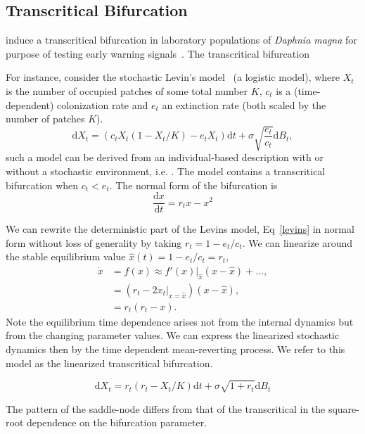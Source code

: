 \documentclass[authoryear, preprint,review,12pt]{elsarticle}
\newcommand{\ud}{\mathrm{d}}
\begin{document}
\subsection{Transcritical Bifurcation}
\citet{Drake2010} induce a transcritical bifurcation in laboratory populations of \emph{Daphnia magna} for purpose of testing early warning signals~\citep{Drake2010}. The transcritical bifurcation 

For instance, consider the stochastic Levin's model~\citep{Levins1969} (a logistic model), where $X_t$ is the number of occupied patches of some total number $K$, $c_t$ is a (time-dependent) colonization rate and $e_t$ an extinction rate (both scaled by the number of patches $K$).  
\begin{equation}
\ud X_t = \left( c_t X_t (1-X_t/K) - e_t X_t \right) \ud t + \sigma \sqrt{\frac{e_t}{c_t}} \ud B_t \label{levins},
\end{equation}
such a model can be derived from an individual-based description with or without a stochastic environment, i.e.  \citep{Kampen2007a, Nisbet2004a}.  The model contains a transcritical bifurcation when $c_t < e_t$.  The normal form of the bifurcation is
\begin{equation}
\frac{\ud x}{\ud t} = r_t x - x^2 
\label{transcritical}
\end{equation}

We can rewrite the deterministic part of the Levins model, Eq~\ref{levins} in normal form without loss of generality by taking $r_t = 1 - e_t/c_t$.  
We can linearize around the stable equilibrium value $\hat x(t) = 1 - e_t/c_t = r_t$, 
\begin{align}
\dot x &=  f(x) \approx f'(x)|_{\hat x} (x - \hat x) + \ldots, \\
 &= (r_t - 2 x_t|_{x=\hat x}) (x - \hat x), \\
 &= r_t(r_t - x).
\end{align}
Note the equilibrium time dependence arises not from the internal dynamics but from the changing parameter values.  We can express the linearized stochastic dynamics then by the time dependent mean-reverting process.  We refer to this model as the linearized transcritical bifurcation.  

\begin{equation}
\ud X_t = r_t (r_t - X_t/K) \ud t + \sigma \sqrt{1+r_t} \ud B_t \label{LTC}
\end{equation}

The pattern of the saddle-node differs from that of the transcritical in the square-root dependence on the bifurcation parameter.
\end{document}
